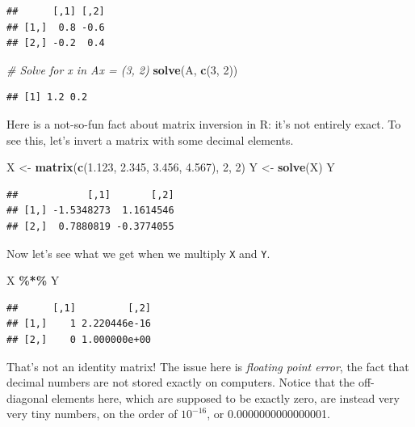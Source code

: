 \documentclass[
  12pt,
  oneside,openany]{book}
\newenvironment{Shaded}{\begin{snugshade}}{\end{snugshade}}
\newcommand{\CommentTok}[1]{\textcolor[rgb]{0.56,0.35,0.01}{\textit{#1}}}
\newcommand{\DecValTok}[1]{\textcolor[rgb]{0.00,0.00,0.81}{#1}}
\newcommand{\FloatTok}[1]{\textcolor[rgb]{0.00,0.00,0.81}{#1}}
\newcommand{\KeywordTok}[1]{\textcolor[rgb]{0.13,0.29,0.53}{\textbf{#1}}}
\newcommand{\NormalTok}[1]{#1}
\newcommand{\OperatorTok}[1]{\textcolor[rgb]{0.81,0.36,0.00}{\textbf{#1}}}
\newcommand{\StringTok}[1]{\textcolor[rgb]{0.31,0.60,0.02}{#1}}
\begin{document}
\begin{verbatim}
##      [,1] [,2]
## [1,]  0.8 -0.6
## [2,] -0.2  0.4
\end{verbatim}

\begin{Shaded}
\begin{Highlighting}[]
\CommentTok{\# Solve for x in Ax = (3, 2)}
\KeywordTok{solve}\NormalTok{(A, }\KeywordTok{c}\NormalTok{(}\DecValTok{3}\NormalTok{, }\DecValTok{2}\NormalTok{))}
\end{Highlighting}
\end{Shaded}

\begin{verbatim}
## [1] 1.2 0.2
\end{verbatim}

Here is a not-so-fun fact about matrix inversion in R: it's not entirely exact. To see this, let's invert a matrix with some decimal elements.

\begin{Shaded}
\begin{Highlighting}[]
\NormalTok{X \textless{}{-}}\StringTok{ }\KeywordTok{matrix}\NormalTok{(}\KeywordTok{c}\NormalTok{(}\FloatTok{1.123}\NormalTok{, }\FloatTok{2.345}\NormalTok{, }\FloatTok{3.456}\NormalTok{, }\FloatTok{4.567}\NormalTok{), }\DecValTok{2}\NormalTok{, }\DecValTok{2}\NormalTok{)}
\NormalTok{Y \textless{}{-}}\StringTok{ }\KeywordTok{solve}\NormalTok{(X)}
\NormalTok{Y}
\end{Highlighting}
\end{Shaded}

\begin{verbatim}
##            [,1]       [,2]
## [1,] -1.5348273  1.1614546
## [2,]  0.7880819 -0.3774055
\end{verbatim}

Now let's see what we get when we multiply \texttt{X} and \texttt{Y}.

\begin{Shaded}
\begin{Highlighting}[]
\NormalTok{X }\OperatorTok{\%*\%}\StringTok{ }\NormalTok{Y}
\end{Highlighting}
\end{Shaded}

\begin{verbatim}
##      [,1]         [,2]
## [1,]    1 2.220446e-16
## [2,]    0 1.000000e+00
\end{verbatim}

That's not an identity matrix! The issue here is \emph{floating point error}, the fact that decimal numbers are not stored exactly on computers. Notice that the off-diagonal elements here, which are supposed to be exactly zero, are instead very very tiny numbers, on the order of \(10^{-16}\), or 0.0000000000000001.
\end{document}
